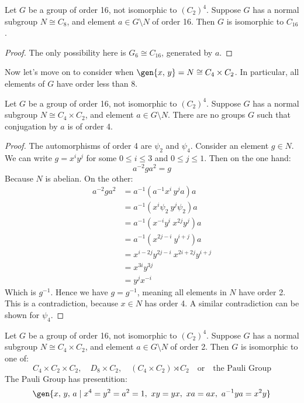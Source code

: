 \begin{lemma}
    Let \(G\) be a group of order 16, not isomorphic to \({(C_{2})}^4\).
    Suppose \(G\) has a normal subgroup \(N \cong C_8\), and element \(a \in G\setminus N\) of order 16.
    Then \(G\) is isomorphic to \(C_{16}\).
\end{lemma}

\begin{proof}
    The only possibility here is \(G_6 \cong C_{16}\), generated by \(a\).
\end{proof}


Now let's move on to consider when \(\gen{x,\,y} = N \cong C_4 \times C_2\).
In particular, all elements of \(G\) have order less than 8.

\begin{lemma}
    Let \(G\) be a group of order 16, not isomorphic to \({(C_{2})}^4\).
    Suppose \(G\) has a normal subgroup \(N \cong C_4 \times C_2\), and element \(a \in G\setminus N\).
    There are no groups \(G\) such that conjugation by \(a\) is of order 4.
\end{lemma}

\begin{proof}
    The automorphisms of order 4 are \(\psi_2\) and \(\psi_4\).
    Consider an element \(g \in N\).
    We can write \(g = x^i y^j\) for some \(0 \leqslant i \leqslant 3\) and \(0 \leqslant j \leqslant 1\).
    Then on the one hand:
    \[a^{-2}ga^2 = g\]
    Because \(N\) is abelian.
    On the other:
    \begin{align*}
        a^{-2}ga^2 &= a^{-1}(a^{-1}x^i\,y^j a)a \\
        &= a^{-1}(x^i\psi_2\ y^j\psi_2)a \\
        &= a^{-1}(x^{-i}y^i\ x^{2j}y^j)a \\
        &= a^{-1}(x^{2j-i}\ y^{i+j})a \\
        &= x^{i-2j}y^{2j-i}\ x^{2i+2j}y^{i+j} \\
        &= x^{3i}y^{3j} \\
        &= y^j x^{-i}
    \end{align*}
    Which is \(g^{-1}\).
    Hence we have \(g = g^{-1}\), meaning all elements in \(N\) have order 2.
    This is a contradiction, because \(x \in N\) has order 4.
    A similar contradiction can be shown for \(\psi_4\).
\end{proof}

\begin{lemma}
    Let \(G\) be a group of order 16, not isomorphic to \({(C_{2})}^4\).
    Suppose \(G\) has a normal subgroup \(N \cong C_4 \times C_2\), and element \(a \in G\setminus N\) of order 2.
    Then \(G\) is isomorphic to one of:
    \[
        C_4 \times C_2 \times C_2, \quad%
        D_8 \times C_2, \quad%
        (C_4 \times C_2) \rtimes C_2 \quad \text{or} \quad%
        \text{the Pauli Group}
    \]
    The Pauli Group has presentition:
    \[
        \gen{x,\,y,\,a \mid x^4 = y^2 = a^2 = 1,\ xy = yx,\ xa = ax,\ a^{-1}ya = x^2 y}
    \]
\end{lemma}

